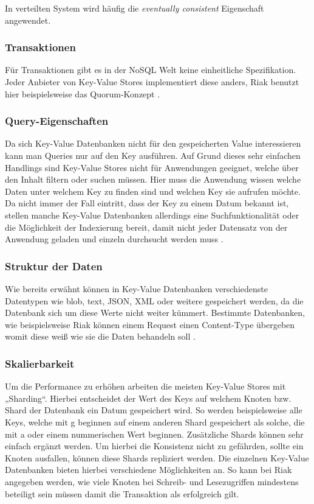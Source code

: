 In verteilten System wird häufig die \textit{eventually consistent} Eigenschaft angewendet. 

\subsubsection{Transaktionen}
Für Transaktionen gibt es in der NoSQL Welt keine einheitliche Spezifikation. Jeder Anbieter von Key-Value Stores implementiert diese anders, Riak benutzt hier beispielsweise das Quorum-Konzept \cite{sadalage01}.

\subsubsection{Query-Eigenschaften}
Da sich Key-Value Datenbanken nicht für den gespeicherten Value interessieren kann man Queries nur auf den Key ausführen. Auf Grund dieses sehr einfachen Handlings sind Key-Value Stores nicht für Anwendungen geeignet, welche über den Inhalt filtern oder suchen müssen. Hier muss die Anwendung wissen welche Daten unter welchem Key zu finden sind und welchen Key sie aufrufen möchte. Da nicht immer der Fall eintritt, dass der Key zu einem Datum bekannt ist, stellen manche Key-Value Datenbanken allerdings eine Suchfunktionalität oder die Möglichkeit der Indexierung bereit, damit nicht jeder Datensatz von der Anwendung geladen und einzeln durchsucht werden muss \cite{sadalage01}. 

\subsubsection{Struktur der Daten}
Wie bereits erwähnt können in Key-Value Datenbanken verschiedenste Datentypen wie blob, text, JSON, XML oder weitere gespeichert werden, da die Datenbank sich um diese Werte nicht weiter kümmert. Bestimmte Datenbanken, wie beispielsweise Riak können einem Request einen Content-Type übergeben womit diese weiß wie sie die Daten behandeln soll \cite{sadalage01}.

\subsubsection{Skalierbarkeit}
Um die Performance zu erhöhen arbeiten die meisten Key-Value Stores mit „Sharding“. Hierbei entscheidet der Wert des Keys auf welchem Knoten bzw. Shard der Datenbank ein Datum gespeichert wird. So werden beispielsweise alle Keys, welche mit g beginnen auf einem anderen Shard gespeichert als solche, die mit a oder einem nummerischen Wert beginnen. Zusätzliche Shards können sehr einfach ergänzt werden. Um hierbei die Konsistenz nicht zu gefährden, sollte ein Knoten ausfallen, können diese Shards repliziert werden. Die einzelnen Key-Value Datenbanken bieten hierbei verschiedene Möglichkeiten an. So kann bei Riak angegeben werden, wie viele Knoten bei Schreib- und Lesezugriffen mindestens beteiligt sein müssen damit die Transaktion als erfolgreich gilt. 

